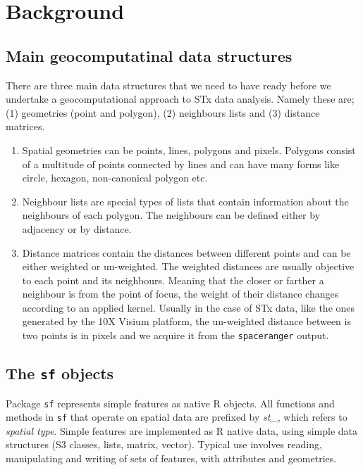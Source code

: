 \documentclass[
]{book}
\begin{document}
\hypertarget{background-5}{%
\section{Background}\label{background-5}}

\hypertarget{main-geocomputatinal-data-structures}{%
\subsection{Main geocomputatinal data structures}\label{main-geocomputatinal-data-structures}}

There are three main data structures that we need to have ready before we undertake a geocomputational approach to STx data analysis. Namely these are; (1) geometries (point and polygon), (2) neighbours lists and (3) distance matrices.

\begin{enumerate}
\def\labelenumi{\arabic{enumi}.}
\item
  Spatial geometries can be points, lines, polygons and pixels. Polygons consist of a multitude of points connected by lines and can have many forms like circle, hexagon, non-canonical polygon etc.
\item
  Neighbour lists are special types of lists that contain information about the neighbours of each polygon. The neighbours can be defined either by adjacency or by distance.
\item
  Distance matrices contain the distances between different points and can be either weighted or un-weighted. The weighted distances are usually objective to each point and its neighbours. Meaning that the closer or farther a neighbour is from the point of focus, the weight of their distance changes according to an applied kernel. Usually in the case of STx data, like the ones generated by the 10X Visium platform, the un-weighted distance between is two points is in pixels and we acquire it from the \texttt{spaceranger} output.
\end{enumerate}

\hypertarget{the-sf-objects}{%
\subsection{\texorpdfstring{The \texttt{sf} objects}{The sf objects}}\label{the-sf-objects}}

Package \texttt{sf} represents simple features as native R objects. All functions and methods in \texttt{sf} that operate on spatial data are prefixed by \emph{st\_}, which refers to \emph{spatial type}. Simple features are implemented as R native data, using simple data structures (S3 classes, lists, matrix, vector). Typical use involves reading, manipulating and writing of sets of features, with attributes and geometries.
\end{document}
